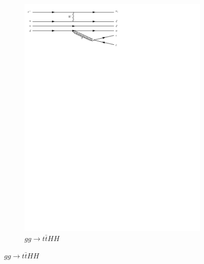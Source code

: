 \begin{figure}[h]
\begin{subfigure}[b]{0.3\textwidth}
    \includegraphics[trim={0.5cm 22cm 10cm 0cm},width=\textwidth]{../Diagrams/D18.pdf}
    \caption{$gg\rightarrow t\bar{t}HH$}
    \label{fey:18}
  \end{subfigure}%
\end{figure}
